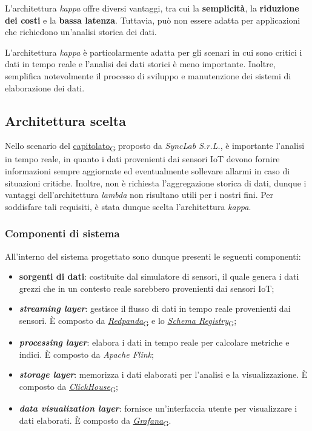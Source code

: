 L'architettura \textit{kappa} offre diversi vantaggi, tra cui la \textbf{semplicità}, la \textbf{riduzione dei costi} e la \textbf{bassa latenza}.
Tuttavia, può non essere adatta per applicazioni che richiedono un'analisi storica dei dati.

L'architettura \textit{kappa} è particolarmente adatta per gli scenari in cui sono critici i dati in tempo reale e l'analisi dei dati storici è meno importante. Inoltre, semplifica notevolmente il processo di sviluppo e manutenzione dei sistemi di elaborazione dei dati.

\subsection{Architettura scelta}
Nello scenario del \href{https://7last.github.io/docs/pb/documentazione-interna/glossario\#capitolato}{capitolato\textsubscript{G}} proposto da \textit{SyncLab S.r.L.}, è importante l'analisi in tempo reale, in quanto i dati provenienti dai sensori IoT devono fornire informazioni sempre aggiornate ed eventualmente
sollevare allarmi in caso di situazioni critiche. Inoltre, non è richiesta l'aggregazione storica di dati, dunque i vantaggi dell'architettura \textit{lambda} non risultano utili per i nostri fini.
Per soddisfare tali requisiti, è stata dunque scelta l'architettura \textit{kappa}.

\subsubsection{Componenti di sistema}
All'interno del sistema progettato sono dunque presenti le seguenti componenti:
\begin{itemize}
	\item \textbf{sorgenti di dati}: costituite dal simulatore di sensori, il quale genera i dati grezzi che in un contesto reale sarebbero provenienti dai sensori IoT;
	\item \textbf{\textit{streaming layer}}: gestisce il flusso di dati in tempo reale provenienti dai sensori. È composto da \href{https://7last.github.io/docs/pb/documentazione-interna/glossario\#redpanda}{\textit{Redpanda}\textsubscript{G}} e lo \href{https://7last.github.io/docs/pb/documentazione-interna/glossario\#schema-registry}{\textit{Schema Registry}\textsubscript{G}};
	\item \textbf{\textit{processing layer}}: elabora i dati in tempo reale per calcolare metriche e indici. È composto da \textit{Apache Flink};
	\item \textbf{\textit{storage layer}}: memorizza i dati elaborati per l'analisi e la visualizzazione. È composto da \href{https://7last.github.io/docs/pb/documentazione-interna/glossario\#clickhouse}{\textit{ClickHouse}\textsubscript{G}};
	\item \textbf{\textit{data visualization layer}}: fornisce un'interfaccia utente per visualizzare i dati elaborati. È composto da \href{https://7last.github.io/docs/pb/documentazione-interna/glossario\#grafana}{\textit{Grafana}\textsubscript{G}}.
\end{itemize}

